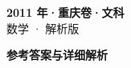 \documentclass[zihao=-4, a4paper]{ctexart}
\begin{document}
\begin{center}
  {\Large\bfseries 2011 年·重庆卷·文科}\\[4pt]
  {\large 数学 · 解析版}
\end{center}
\medskip
{}

\clearpage
{}
\begin{center}{\Large\bfseries 参考答案与详细解析}\end{center}
\medskip

\end{document}
